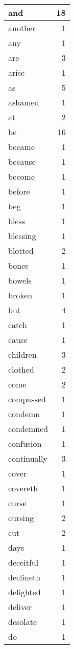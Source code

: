 \begin{center}
\begin{longtable}{l|r}
and & 18 \\ \hline
another & 1 \\ \hline
any & 1 \\ \hline
are & 3 \\ \hline
arise & 1 \\ \hline
as & 5 \\ \hline
ashamed & 1 \\ \hline
at & 2 \\ \hline
be & 16 \\ \hline
became & 1 \\ \hline
because & 1 \\ \hline
become & 1 \\ \hline
before & 1 \\ \hline
beg & 1 \\ \hline
bless & 1 \\ \hline
blessing & 1 \\ \hline
blotted & 2 \\ \hline
bones & 1 \\ \hline
bowels & 1 \\ \hline
broken & 1 \\ \hline
but & 4 \\ \hline
catch & 1 \\ \hline
cause & 1 \\ \hline
children & 3 \\ \hline
clothed & 2 \\ \hline
come & 2 \\ \hline
compassed & 1 \\ \hline
condemn & 1 \\ \hline
condemned & 1 \\ \hline
confusion & 1 \\ \hline
continually & 3 \\ \hline
cover & 1 \\ \hline
covereth & 1 \\ \hline
curse & 1 \\ \hline
cursing & 2 \\ \hline
cut & 2 \\ \hline
days & 1 \\ \hline
deceitful & 1 \\ \hline
declineth & 1 \\ \hline
delighted & 1 \\ \hline
deliver & 1 \\ \hline
desolate & 1 \\ \hline
do & 1 \\ \hline

\end{longtable}
\end{center}
